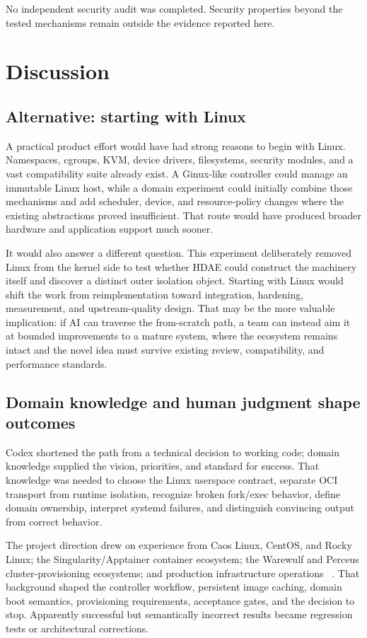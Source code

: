 \documentclass[11pt]{article}
\begin{document}
No independent security audit was completed. Security properties beyond the
tested mechanisms remain outside the evidence reported here.

\section{Discussion}

\subsection{Alternative: starting with Linux}

A practical product effort would have had strong reasons to begin with Linux.
Namespaces, cgroups, KVM, device drivers, filesystems, security modules, and a
vast compatibility suite already exist. A Ginux-like controller could manage
an immutable Linux host, while a domain experiment could initially combine
those mechanisms and add scheduler, device, and resource-policy changes where
the existing abstractions proved insufficient. That route would have produced
broader hardware and application support much sooner.

It would also answer a different question. This experiment deliberately
removed Linux from the kernel side to test whether HDAE could
construct the machinery itself and discover a distinct outer isolation object.
Starting with Linux would shift the work from reimplementation toward
integration, hardening, measurement, and upstream-quality design. That may be
the more valuable implication: if AI can traverse the from-scratch path, a
team can instead aim it at bounded improvements to a mature system, where
the ecosystem remains intact and the novel idea must survive existing review,
compatibility, and performance standards.

\subsection{Domain knowledge and human judgment shape outcomes}

Codex shortened the path from a technical decision to working code; domain
knowledge supplied the vision, priorities, and standard for success. That
knowledge was needed to choose the Linux userspace contract, separate OCI
transport from runtime isolation, recognize broken fork/exec behavior, define
domain ownership, interpret systemd failures, and distinguish convincing output
from correct behavior.

The project direction drew on experience from Caos Linux, CentOS, and Rocky
Linux; the Singularity/Apptainer container ecosystem; the Warewulf and Perceus
cluster-provisioning ecosystems; and production infrastructure operations
~\cite{rockyAbout2026,ciqKurtzer2026}. That background shaped the controller
workflow, persistent image caching, domain boot semantics, provisioning
requirements, acceptance gates, and the decision to stop. Apparently
successful but semantically incorrect results became regression tests or
architectural corrections.
\end{document}
